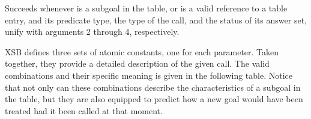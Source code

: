 \begin{description}


%
Succeeds whenever  is a subgoal in the table, or
 is a valid reference to a table entry, and its
predicate type, the type of the call, and the status of its answer
set, unify with arguments 2 through 4, respectively.

XSB defines three sets of atomic constants, one for each parameter.
Taken together, they provide a detailed description of the given call.
The valid combinations and their specific meaning is given in the
following table.  Notice that not only can these combinations describe
the characteristics of a subgoal in the table, but they are also
equipped to predict how a new goal would have been treated had it been
called at that moment.


\end{description}
